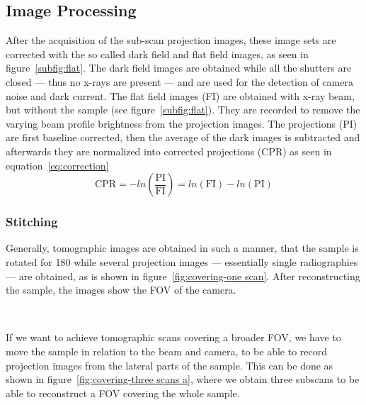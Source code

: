 \subsection{Image Processing}
\label{subsec:image processing}
After the acquisition of the sub-scan projection images, these image sets are corrected with the so called dark field and flat field images, as seen in figure~\ref{subfig:flat}. The dark field images are obtained while all the shutters are closed --- thus no x-rays are present --- and are used for the detection of camera noise and dark current. The flat field images (FI) are obtained with x-ray beam, but without the sample (see figure~\ref{subfig:flat}). They are recorded to remove the varying beam profile brightness from the projection images. The projections (PI) are first baseline corrected, then the average of the dark images is subtracted and afterwards they are normalized into corrected projections (CPR) as seen in equation~\ref{eq:correction}
\begin{equation}
\text{CPR}=-ln\left(\frac{\text{PI}}{\text{FI}}\right)=ln(\text{FI})-ln(\text{PI})
\label{eq:correction}
\end{equation}

\subsubsection{Stitching}
\label{subsec:stitching}
Generally, tomographic images are obtained in such a manner, that the sample is rotated for \unit{180}{\degree} while several projection images --- essentially single radiographies --- are obtained, as is shown in figure~\ref{fig:covering-one scan}. After reconstructing the sample, the images show the FOV of the camera.

\begin{figure*}[tb]
	\centering
	\\
	\caption{Covering the FOV -- one scan}
	\label{fig:covering-one scan}
\end{figure*}

If we want to achieve tomographic scans covering a broader FOV, we have to move the sample in relation to the beam and camera, to be able to record projection images from the lateral parts of the sample. This can be done as shown in figure~\ref{fig:covering-three scans a}, where we obtain three subscans to be able to reconstruct a FOV covering the whole sample.

